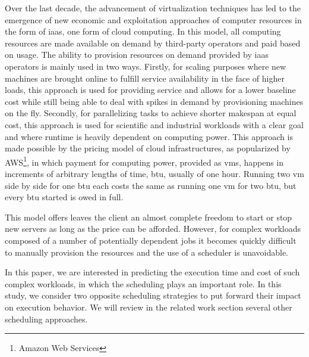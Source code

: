 \documentclass[10pt,conference,compsocconf]{IEEEtran}
\begin{document}
Over the last decade, the advancement  of virtualization techniques has  led to
the emergence of new economic and exploitation approaches of computer resources in
the form of \ac{iaas}, one form of cloud computing. In this model, all computing
resources are made available on demand  by third-party operators and paid based
on usage.   The ability to provision  resources on demand provided  by \ac{iaas}
operators is mainly  used in two ways.  Firstly, for  scaling purposes where new
machines  are brought  online to  fulfill service  availability in  the face  of
higher loads, this approach is used for providing service and allows for a lower
baseline cost while still being able to deal with spikes in demand by provisioning
machines  on  the fly. Secondly, for  parallelizing  tasks to  achieve  shorter
makespan at  equal cost,  this approach  is used  for scientific  and industrial
workloads with a clear goal and  where runtime is heavily  dependent on computing
power.   This  approach  is  made  possible   by  the  pricing  model  of  cloud
infrastructures, as  popularized by  AWS\footnote{Amazon Web Services},  in which
payment  for computing  power, provided  as  \acp{vm}, happens  in increments of
arbitrary lengths of time, \ac{btu},  usually of  one hour. Running  two \ac{vm}
side by side for one \ac{btu} each costs the same as running one \ac{vm} for two
\ac{btu}, but every \ac{btu} started is owed in full.

This model offers leaves the client an  almost complete freedom to start or stop
new servers as long as the price can be afforded. However, for complex workloads
composed of a number of potentially dependent jobs it becomes quickly difficult
to manually provision the resources and the use of a scheduler is unavoidable.
 
In this paper,  we are interested in  predicting the execution time  and cost of
such complex workloads, in which the scheduling plays an important role. In this
study,  we consider  two opposite  scheduling  strategies to  put forward  their
impact on execution behavior. We will review in the related work section several
other scheduling approaches.
\end{document}
